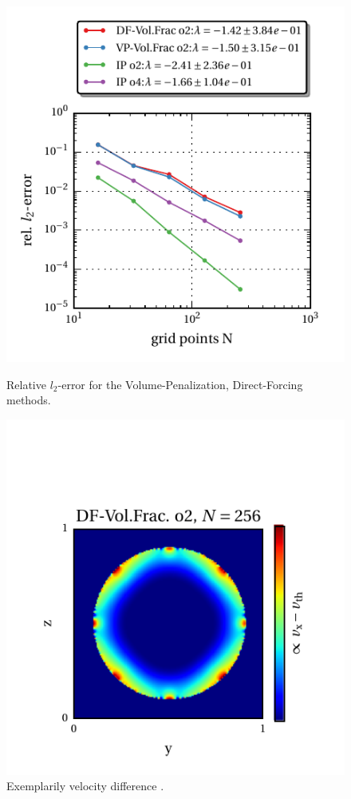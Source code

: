 \begin{figure}[!bp]
  \begin{minipage}[c]{0.5\textwidth}
      \includegraphics{gfx/immersed_boundary/hpflow/hd/all.pdf}
      \caption{\label{vali:hpflow_results_gchd_all}
          Relative $l_2$-error for the Volume-Penalization, Direct-Forcing  methods.}

  \end{minipage}
  \begin{minipage}[c]{0.5\textwidth}
      \includegraphics{gfx/immersed_boundary/hpflow/hd/example.pdf}
      \caption{\label{vali:hpflow_results_gchd_example}
        Exemplarily velocity difference .
         }
  \end{minipage}
\end{figure}


